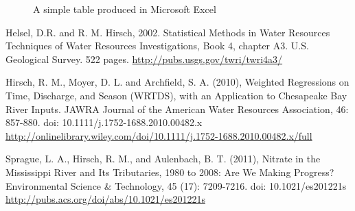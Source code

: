 \documentclass[a4paper,11pt]{article}
\begin{document}
\begin{figure}[ht!]
\centering
\caption{A simple table produced in Microsoft Excel}
\label{overflow}
\end{figure}


\clearpage
\begin{thebibliography}{10}

Helsel, D.R. and R. M. Hirsch, 2002. Statistical Methods in Water Resources Techniques of Water Resources Investigations, Book 4, chapter A3. U.S. Geological Survey. 522 pages. \url{http://pubs.usgs.gov/twri/twri4a3/}

Hirsch, R. M., Moyer, D. L. and Archfield, S. A. (2010), Weighted Regressions on Time, Discharge, and Season (WRTDS), with an Application to Chesapeake Bay River Inputs. JAWRA Journal of the American Water Resources Association, 46: 857-880. doi: 10.1111/j.1752-1688.2010.00482.x \url{http://onlinelibrary.wiley.com/doi/10.1111/j.1752-1688.2010.00482.x/full}

Sprague, L. A., Hirsch, R. M., and Aulenbach, B. T. (2011), Nitrate in the Mississippi River and Its Tributaries, 1980 to 2008: Are We Making Progress? Environmental Science \& Technology, 45 (17): 7209-7216. doi: 10.1021/es201221s \url{http://pubs.acs.org/doi/abs/10.1021/es201221s}

\end{thebibliography}
\end{document}
